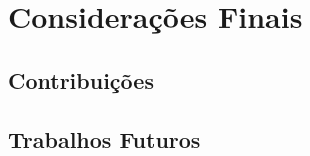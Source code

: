     \chapter{Considerações Finais}
        \label{cap:conclusao}
    \section{Contribuições}
    \section{Trabalhos Futuros}
